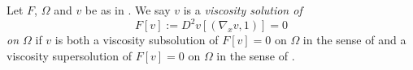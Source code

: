 \begin{definition}
Let $F$, $\Omega$ and $v$ be as in . We say $v$ is a
\emph{viscosity solution of}
\[
  F[v]:=D^2v[(\nabla_xv,1)]=0
\]
\emph{on $\Omega$} if $v$ is both a viscosity subsolution of $F[v]=0$ on
$\Omega$ in the sense of  and a viscosity supersolution of
$F[v]=0$ on $\Omega$ in the sense of .
\end{definition}
